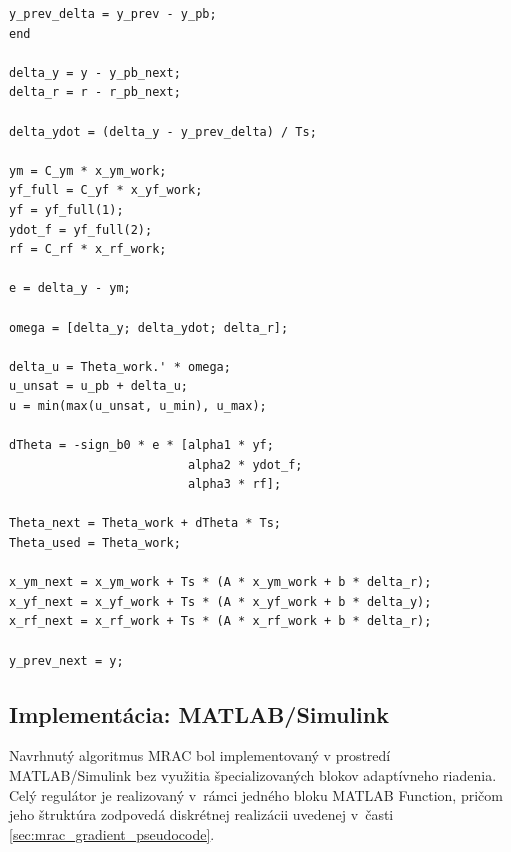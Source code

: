 \begin{lstlisting}[style=pseudocode,
caption={Pseudokód diskrétnej implementácie gradientného MRAC regulátora s prechodom do súradníc pracovného bodu},
label={lst:mrac_gradient_realtime}]
    y_prev_delta = y_prev - y_pb;
end

delta_y = y - y_pb_next;
delta_r = r - r_pb_next;

delta_ydot = (delta_y - y_prev_delta) / Ts;

ym = C_ym * x_ym_work;
yf_full = C_yf * x_yf_work;
yf = yf_full(1);
ydot_f = yf_full(2);
rf = C_rf * x_rf_work;

e = delta_y - ym;

omega = [delta_y; delta_ydot; delta_r];

delta_u = Theta_work.' * omega;
u_unsat = u_pb + delta_u;
u = min(max(u_unsat, u_min), u_max);

dTheta = -sign_b0 * e * [alpha1 * yf;
                         alpha2 * ydot_f;
                         alpha3 * rf];

Theta_next = Theta_work + dTheta * Ts;
Theta_used = Theta_work;

x_ym_next = x_ym_work + Ts * (A * x_ym_work + b * delta_r);
x_yf_next = x_yf_work + Ts * (A * x_yf_work + b * delta_y);
x_rf_next = x_rf_work + Ts * (A * x_rf_work + b * delta_r);

y_prev_next = y;

\end{lstlisting}


\subsection{Implementácia: MATLAB/Simulink}
\label{sec:mrac_matlab_implementation}


Navrhnutý algoritmus MRAC
bol implementovaný v prostredí MATLAB/Simulink
bez využitia špecializovaných blokov adaptívneho riadenia.
Celý regulátor je realizovaný
v~rámci jedného bloku MATLAB Function,
pričom jeho štruktúra zodpovedá
diskrétnej realizácii uvedenej
v~časti \ref{sec:mrac_gradient_pseudocode}.


